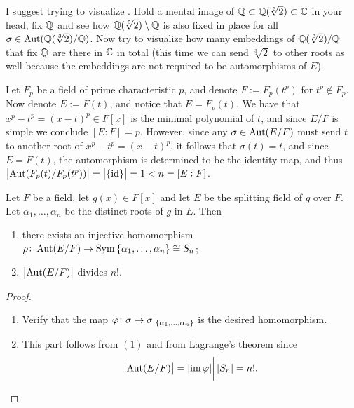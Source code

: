 \documentclass[11pt,a4paper]{article}
\begin{document}
\begin{remark}
  I suggest trying to visualize .
  Hold a mental image of $\mathbb{Q} \subset \mathbb{Q}(\sqrt[3]{2}) \subset \mathbb{C}$
  in your head, fix $\mathbb{Q}$ and see how $\mathbb{Q}(\sqrt[3]{2})\setminus\mathbb{Q}$
  is also fixed in place for all $\sigma \in \operatorname{Aut}(\mathbb{Q}(\sqrt[3]{2})/\mathbb{Q})$.
  Now try to visualize how many embeddings of $\mathbb{Q}(\sqrt[3]{2})/\mathbb{Q}$
  that fix $\mathbb{Q}$ are there in $\mathbb{C}$ in total (this time we can
  send $\sqrt[3]{2}$ to other roots as well because the embeddings
  are not required to be automorphisms of $E$).
\end{remark}

\begin{example}
  \label{exmp:aut-of-field-of-char-p}
  Let $F_p$ be a field of prime characteristic $p$,
  and denote $F := F_p(t^p)$ for $t^p \notin F_p$.
  Now denote $E := F(t)$, and notice that $E = F_p(t)$.
  We have that $x^p - t^p = (x - t)^p \in F[x]$ is the minimal
  polynomial of $t$, and since $E/F$ is simple we conclude $[E : F] = p$.
  However, since any $\sigma \in \operatorname{Aut}(E/F)$ must send $t$ to another
  root of $x^p - t^p = (x - t)^p$,
  it follows that $\sigma(t) = t$,
  and since $E = F(t)$,
  the automorphism is determined to be the identity map,
  and thus $\left\lvert\operatorname{Aut}(F_p(t)/F_p(t^p))\right\rvert = \left\lvert\left\{\operatorname{id}\right\}\right\rvert = 1 < n = [E : F]$.
\end{example}

\begin{theorem}
  \label{thm:injection-to-sn}
  Let $F$ be a field, let $g(x) \in F[x]$ and let $E$ be the splitting
  field of $g$ over $F$.
  Let $\alpha_1,\dots,\alpha_n$ be the distinct roots of $g$ in $E$.
  Then
  \begin{enumerate}
    \item[(1)] there exists an injective homomorphism
      $\rho \colon \operatorname{Aut}(E/F) \to \mathrm{Sym}\left\{\alpha_1,\dots,\alpha_n\right\}
        \cong S_n$;
    \item[(2)] $\left\lvert\operatorname{Aut}(E/F)\right\rvert$ divides $n!$.
  \end{enumerate}
\end{theorem}
\begin{proof} \phantom{}
  \begin{enumerate}
    \item[(1)] Verify that the map
      $\varphi \colon \sigma \mapsto \sigma\vert_{\left\{\alpha_1,\dots,\alpha_n\right\}}$
      is the desired homomorphism.
    \item[(2)] This part follows from $(1)$ and from Lagrange's theorem
      since
      \[
        \left\lvert\operatorname{Aut}(E/F)\right\rvert = \left\lvert\operatorname{im} \varphi\right\rvert \biggr\vert \left\lvert S_n\right\rvert = n!.
      \]
  \end{enumerate}
\end{proof}
\end{document}

